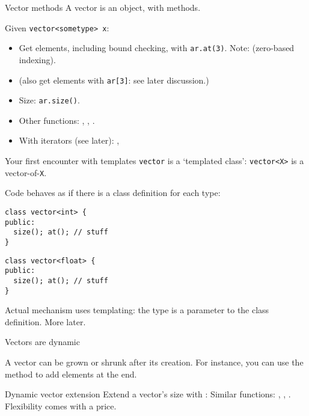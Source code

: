 \begin{slide}{Vector methods}
  \label{sl:vector-method}
  A vector is an object, with methods.

  Given \lstinline+vector<sometype> x+:
  \begin{itemize}
  \item Get elements, including bound checking, with
    \lstinline{ar.at(3)}.
    Note: (zero-based indexing).
  \item (also get elements with \lstinline{ar[3]}: see later discussion.)
  \item Size: \lstinline{ar.size()}.
  \item Other functions: , , .
  \item With iterators (see later): , 
  \end{itemize}
\end{slide}

\begin{block}{Your first encounter with templates}
  \label{sl:vector-template}
 \lstinline{vector} is a `templated class':
    \lstinline{vector<X>} is a vector-of-\lstinline{X}.

    Code behaves as if there is a class definition for each type:
    \begin{multicols}{2}
      \small
\begin{lstlisting}
class vector<int> {
public:
  size(); at(); // stuff
}
\end{lstlisting}
\begin{lstlisting}
class vector<float> {
public:
  size(); at(); // stuff
}
\end{lstlisting}
    \end{multicols}
    Actual mechanism uses templating:
    the type is a parameter to the class definition. More later.
\end{block}

 {Vectors are dynamic}
\label{sec:stdvector-dynamic}

A vector
can be grown or shrunk after its creation.
For instance, you can use the  method to add elements at the end.

\begin{block}{Dynamic vector extension}
  \label{sl:vector-dynamic}
  Extend a vector's size with :
  Similar functions: , , .
  \slidenewline
  Flexibility comes with a price.
\end{block}

